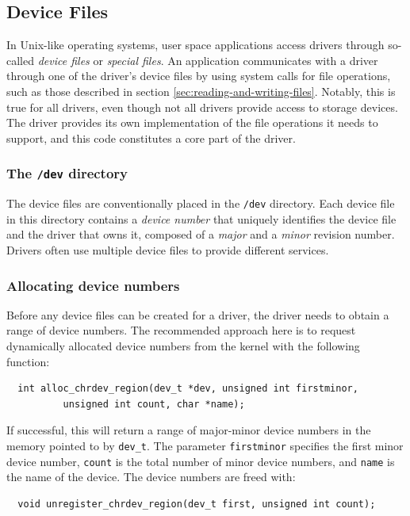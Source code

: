 \subsection{Device Files}\label{device-files}
In Unix-like operating systems, user space applications access drivers through so-called \emph{device files} or \emph{special files}. An application communicates with a driver through one of the driver's device files by using system calls for file operations, such as those described in section \ref{sec:reading-and-writing-files}. Notably, this is true for all drivers, even though not all drivers provide access to storage devices. The driver provides its own implementation of the file operations it needs to support, and this code constitutes a core part of the driver.

\subsubsection{The \texttt{/dev} directory}
The device files are conventionally placed in the \texttt{/dev} directory. Each device file in this directory contains a \emph{device number} that uniquely identifies the device file and the driver that owns it, composed of a \emph{major} and a \emph{minor} revision number. Drivers often use multiple device files to provide different services.

\subsubsection{Allocating device numbers}
Before any device files can be created for a driver, the driver needs to obtain a range of device numbers. The recommended approach here is to request dynamically allocated device numbers from the kernel with the following function:
\begin{verbatim}
  int alloc_chrdev_region(dev_t *dev, unsigned int firstminor,
          unsigned int count, char *name);
\end{verbatim}
If successful, this will return a range of major-minor device numbers in the memory pointed to by \texttt{dev\_t}. The parameter \texttt{firstminor} specifies the first minor device number, \texttt{count} is the total number of minor device numbers, and \texttt{name} is the name of the device. The device numbers are freed with:
\begin{verbatim}
  void unregister_chrdev_region(dev_t first, unsigned int count);
\end{verbatim}

